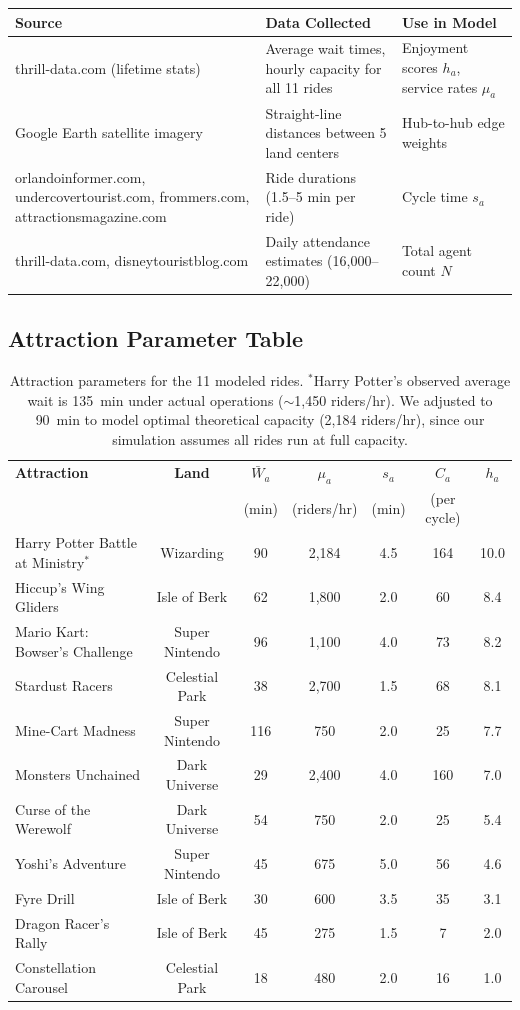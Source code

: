 \documentclass[11pt]{article}
\begin{document}
\begin{table}[H]
\centering
\begin{tabular}{p{3.5cm}p{5cm}p{5cm}}
\toprule
\textbf{Source} & \textbf{Data Collected} & \textbf{Use in Model} \\
\midrule
thrill-data.com (lifetime stats) & Average wait times, hourly capacity for all 11 rides & Enjoyment scores $h_a$, service rates $\mu_a$ \\
Google Earth satellite imagery & Straight-line distances between 5 land centers & Hub-to-hub edge weights \\
orlandoinformer.com, undercovertourist.com, frommers.com, attractionsmagazine.com & Ride durations (1.5--5 min per ride) & Cycle time $s_a$ \\
thrill-data.com, disneytouristblog.com & Daily attendance estimates (16,000--22,000) & Total agent count $N$ \\
\bottomrule
\end{tabular}
\end{table}

\subsection{Attraction Parameter Table}

\begin{table}[H]
\centering
\small
\begin{tabular}{lcccccc}
\toprule
\textbf{Attraction} & \textbf{Land} & $\bar{W}_a$ & $\mu_a$ & $s_a$ & $C_a$ & $h_a$ \\
 & & (min) & (riders/hr) & (min) & (per cycle) & \\
\midrule
Harry Potter Battle at Ministry$^*$ & Wizarding & 90 & 2,184 & 4.5 & 164 & 10.0 \\
Hiccup's Wing Gliders & Isle of Berk & 62 & 1,800 & 2.0 & 60 & 8.4 \\
Mario Kart: Bowser's Challenge & Super Nintendo & 96 & 1,100 & 4.0 & 73 & 8.2 \\
Stardust Racers & Celestial Park & 38 & 2,700 & 1.5 & 68 & 8.1 \\
Mine-Cart Madness & Super Nintendo & 116 & 750 & 2.0 & 25 & 7.7 \\
Monsters Unchained & Dark Universe & 29 & 2,400 & 4.0 & 160 & 7.0 \\
Curse of the Werewolf & Dark Universe & 54 & 750 & 2.0 & 25 & 5.4 \\
Yoshi's Adventure & Super Nintendo & 45 & 675 & 5.0 & 56 & 4.6 \\
Fyre Drill & Isle of Berk & 30 & 600 & 3.5 & 35 & 3.1 \\
Dragon Racer's Rally & Isle of Berk & 45 & 275 & 1.5 & 7 & 2.0 \\
Constellation Carousel & Celestial Park & 18 & 480 & 2.0 & 16 & 1.0 \\
\bottomrule
\end{tabular}
\caption{Attraction parameters for the 11 modeled rides. $^*$Harry Potter's observed average wait is 135~min under actual operations ($\sim$1,450 riders/hr). We adjusted to 90~min to model optimal theoretical capacity (2,184 riders/hr), since our simulation assumes all rides run at full capacity.}
\end{table}
\end{document}
